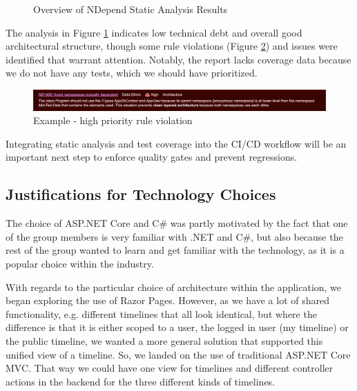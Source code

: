 \documentclass[12pt,a4paper,reqno]{report}
\begin{document}
\begin{figure}[H]
\begin{minipage}[b]{0.53\textwidth}
    \end{minipage}
    \caption{Overview of NDepend Static Analysis Results }
    \label{fig:code-analysis}
\end{figure}

The analysis in Figure \ref{fig:code-analysis} indicates low technical debt and overall good architectural structure, though some rule violations (Figure \ref{fig:rule-violation}) and issues were identified that warrant attention. Notably, the report lacks coverage data because we do not have any tests, which we should have prioritized.

\begin{figure}[H]
    \centering
    \includegraphics[width=\textwidth]{images/high-priority-rule-violation.png}
    \caption{Example - high priority rule violation}
    \label{fig:rule-violation}
\end{figure}

Integrating static analysis and test coverage into the CI/CD workflow will be an important next step to enforce quality gates and prevent regressions.

\subsection{Justifications for Technology Choices}

The choice of ASP.NET Core and C\# was partly motivated by the fact that one of the group members is very familiar with .NET and C\#, but also because the rest of the group wanted to learn and get familiar with the technology, as it is a popular choice within the industry.

With regards to the particular choice of architecture within the application, we began exploring the use of Razor Pages. However, as we have a lot of shared functionality, e.g. different timelines that all look identical, but where the difference is that it is either scoped to a user, the logged in user (my timeline) or the public timeline, we wanted a more general solution that supported this unified view of a timeline. So, we landed on the use of traditional ASP.NET Core MVC. That way we could have one view for timelines and different controller actions in the backend for the three different kinds of timelines.
\end{document}
